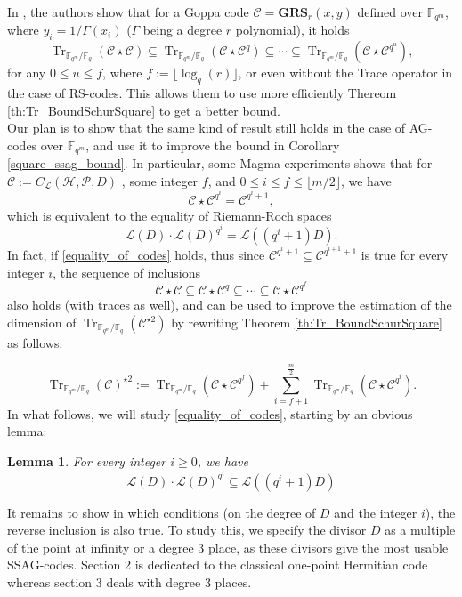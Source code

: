 \documentclass[a4paper]{article}
\newtheorem{lem1}{Lemma}
\newcommand{\calH}{\mathcal{H}}
\newcommand{\calL}{\mathcal{L}}
\newcommand{\calC}{\mathcal{C}}
\newcommand{\fq}{\mathbb{F}_{q}}
\newcommand{\Tr}[1]{\operatorname{Tr}_{\mathbb{F}_{q^m}/\fq}\left(#1\right)}
\begin{document}
In \cite{rocco}, the authors show that for a Goppa code $\calC = \mathbf{GRS}_r(x,y)$ defined over $\mathbb{F}_{q^m}$, where $y_i = 1/\Gamma(x_i)$ ($\Gamma$ being a degree $r$ polynomial), it holds
\[\Tr{\calC\star\calC} \subseteq \Tr{\calC\star\calC^{q}} \subseteq \cdots \subseteq \Tr{\calC\star\calC^{q^u}},\]
for any $0 \leq u \leq f$,
where $f :=\lfloor\log_q(r)\rfloor $, or even without the Trace operator in the case of RS-codes. This allows them to use more efficiently Thereom \ref{th:Tr_BoundSchurSquare} to get a better bound. \\
Our plan is to show that the same kind of result still holds in the case of AG-codes over $\mathbb{F}_{q^m}$, and use it to improve the bound in Corollary \ref{square_ssag_bound}. In particular, some Magma experiments shows that for $\mathcal{C} := C_{\calL}(\calH,\mathcal{P},D)$ , some integer $f$, and $0 \leq i \leq f \leq \lfloor m/2 \rfloor$, we have
\begin{equation} \label{equality_of_codes}
 \calC \star \calC^{q^i} = \calC^{q^i+1},
\end{equation}
which is equivalent to the equality of Riemann-Roch spaces
\[ \calL(D) \cdot \calL(D)^{q^i} = \calL((q^i+1)D).\]
In fact, if \eqref{equality_of_codes} holds, thus since 
$\calC^{q^i+1} \subseteq \calC^{q^{i+1}+1}$ is true for every integer $i$, the sequence of inclusions 
\[\calC\star\calC \subseteq \calC\star\calC^{q} \subseteq \cdots \subseteq \calC\star\calC^{q^f}\]
also holds (with traces as well), and can be used to improve the estimation of the dimension of $\Tr{\calC^{\star2}}$ by rewriting Theorem \ref{th:Tr_BoundSchurSquare} as follows:

\begin{equation}\label{eq:dim_tr_inclusion}
	\Tr{\calC}^{\star2}:=\Tr{\mathcal{C} \star \mathcal{C}^{q^f}} + \sum_{i= f+1}^{\frac{m}{2}} \Tr{\mathcal{C} \star \mathcal{C}^{q^i}}.
\end{equation}
In what follows, we will study \eqref{equality_of_codes}, starting by an obvious lemma: 

\begin{lem1} \label{lem:ovious_inclusion_RR_spaces}
For every integer $i \geq 0$, we have
\[\calL(D) \cdot \calL(D)^{q^i} \subseteq \calL((q^i+1)D)\]
\end{lem1}

It remains to show in which conditions (on the degree of $D$ and the integer $i$), the reverse inclusion is also true. To study this, we specify the divisor $D$ as a multiple of the point at infinity or a degree 3 place, as these divisors give the most usable SSAG-codes. Section 2 is dedicated to the classical one-point Hermitian code whereas section 3 deals with degree 3 places.
\end{document}
